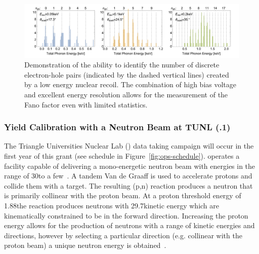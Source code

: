 
\begin{figure}[t]
\centering
\includegraphics[width=\textwidth]{Figures/Phtot-Hist-Neutron-beam-HiRes-G4}
\caption{
Demonstration of the ability to identify the number of discrete electron-hole pairs (indicated by the dashed vertical lines) created by a low energy nuclear recoil. The combination of high bias voltage and excellent energy resolution allows for the measurement of the Fano factor even with limited statistics.
}
\label{fig:eh_counting}
\end{figure}

\subsubsection{Yield Calibration with a Neutron Beam at TUNL (.1)}
\label{sec:tunl}

The Triangle Universities Nuclear Lab (\tunl) data taking campaign will occur in the first year of this grant (see schedule in Figure~\ref{fig:ops-schedule}). \tunl operates a facility capable of delivering a mono-energetic neutron beam with energies in the range of 30\keV to a few\MeV~\cite{TUNL:website,Theprecisionquench:2014tw}. A tandem Van de Graaff is used to accelerate protons and collide them with a  target. The resulting (p,n) reaction produces a neutron that is primarily collinear with the proton beam. At a proton threshold energy of 1.88\MeV the reaction produces neutrons with 29.7\keV kinetic energy which are kinematically constrained to be in the forward direction. Increasing the proton energy allows for the production of neutrons with a range of kinetic energies and directions, however by selecting a particular direction (e.g. collinear with the proton beam) a unique neutron energy is obtained~\cite{1999NIMPB.152....1L}.

